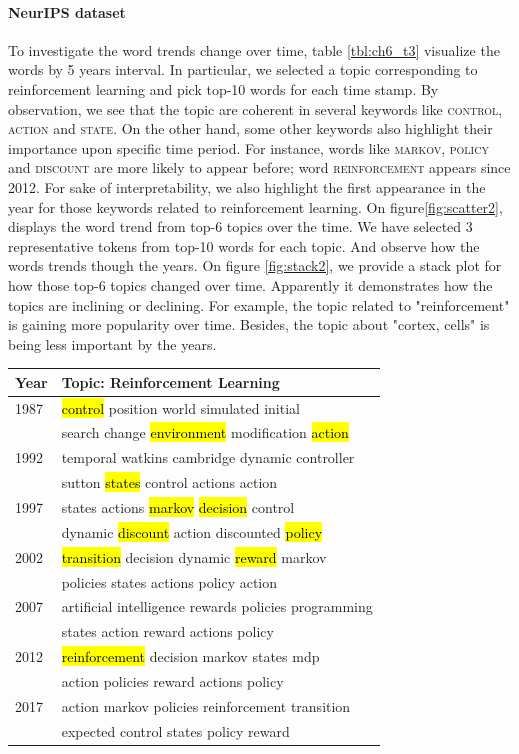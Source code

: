 \paragraph{NeurIPS dataset} %
To investigate the word trends change over time, table \ref{tbl:ch6_t3} visualize the words by 5 years interval. In particular, we selected a topic corresponding to reinforcement learning and pick top-10 words for each time stamp. By observation, we see that the topic are coherent in several keywords like \textsc{control}, \textsc{action} and \textsc{state}. On the other hand, some other keywords also highlight their importance upon specific time period. For instance, words like \textsc{markov}, \textsc{policy} and \textsc{discount} are more likely to appear before; word \textsc{reinforcement} appears since 2012. For sake of interpretability, we also highlight the first appearance in the year for those keywords related to reinforcement learning.
On figure\ref{fig:scatter2}, displays the word trend from top-6 topics over the time. We have selected 3 representative tokens from top-10 words for each topic. And observe how the words trends though the years. 
On figure \ref{fig:stack2}, we provide a stack plot for how those top-6 topics changed over time. Apparently it demonstrates how the topics are inclining or declining. For example, the topic related to "reinforcement" is gaining more popularity over time. Besides, the topic about "cortex, cells" is being less important by the years.
\begin{table}[h]
\centering
\begin{tabular}{ll}
\hline
Year&Topic: Reinforcement Learning\\ \hline
1987 &\hl{control} position world simulated initial \\
&search change \hl{environment} modification \hl{action}\\
1992 &temporal watkins cambridge dynamic controller \\
&sutton \hl{states} control actions action\\
1997 &states actions \hl{markov} \hl{decision} control \\
&dynamic \hl{discount} action discounted \hl{policy}\\
2002 &\hl{transition} decision dynamic \hl{reward} markov \\
&policies states actions policy action\\
2007 &artiﬁcial intelligence rewards policies programming \\
&states action reward actions policy\\
2012 &\hl{reinforcement} decision markov states mdp \\
&action policies reward actions policy\\
2017 &action markov policies reinforcement transition \\
&expected control states policy reward\\
\hline
\end{tabular}
\end{table}
